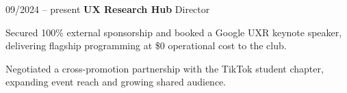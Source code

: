 \begin{twocolentry}{09/2024 – present} \textbf{UX Research Hub} 
    \newline Director \end{twocolentry}
\begin{onecolentry}
\begin{highlights}
\item Secured 100\% external sponsorship and booked a Google UXR keynote speaker, delivering flagship programming at \$0 operational cost to the club.
\item Negotiated a cross-promotion partnership with the TikTok student chapter, expanding event reach and growing shared audience.
\end{highlights}
\end{onecolentry}